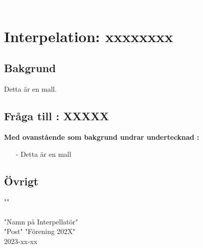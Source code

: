 \textcolor{white}{.} %



\section*{Interpelation: xxxxxxxx}
\subsection*{Bakgrund}
Detta är en mall. 
\subsection*{Fråga till : XXXXX}
\textbf{Med ovanstående som bakgrund undrar undertecknad :}
\begin{itemize}
    \item[-] Detta är en mall
     
    
\end{itemize} 




\subsection*{Övrigt}
""\\


\noindent \makebox[2.5in]{\hrulefill} \\
\noindent "Namn på Interpellatör" \\
"Post" "Förening 202X"  \\ %
2023-xx-xx %
